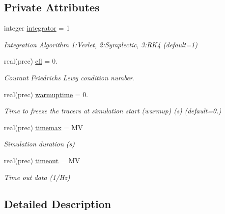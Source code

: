 \subsection*{Private Attributes}
\begin{DoxyCompactItemize}
\item 
integer \mbox{\hyperlink{structsimulation__globals__mod_1_1parameters__t_a4e57d5a1897acaf67eb14e39e3e0cf21}{integrator}} = 1
\begin{DoxyCompactList}\small\item\em Integration Algorithm 1\+:Verlet, 2\+:Symplectic, 3\+:R\+K4 (default=1) \end{DoxyCompactList}\item 
real(prec) \mbox{\hyperlink{structsimulation__globals__mod_1_1parameters__t_a63d8108183b786ec9acf16af2164bda1}{cfl}} = 0.
\begin{DoxyCompactList}\small\item\em Courant Friedrichs Lewy condition number. \end{DoxyCompactList}\item 
real(prec) \mbox{\hyperlink{structsimulation__globals__mod_1_1parameters__t_aed7511e2225ac602d053476e4688d49a}{warmuptime}} = 0.
\begin{DoxyCompactList}\small\item\em Time to freeze the tracers at simulation start (warmup) (s) (default=0.) \end{DoxyCompactList}\item 
real(prec) \mbox{\hyperlink{structsimulation__globals__mod_1_1parameters__t_ad09359247decb284f0ec62e1b9a817b0}{timemax}} = MV
\begin{DoxyCompactList}\small\item\em Simulation duration (s) \end{DoxyCompactList}\item 
real(prec) \mbox{\hyperlink{structsimulation__globals__mod_1_1parameters__t_af4190961e6191cf07a9b04b0b864ec95}{timeout}} = MV
\begin{DoxyCompactList}\small\item\em Time out data (1/\+Hz) \end{DoxyCompactList}\end{DoxyCompactItemize}


\subsection{Detailed Description}


